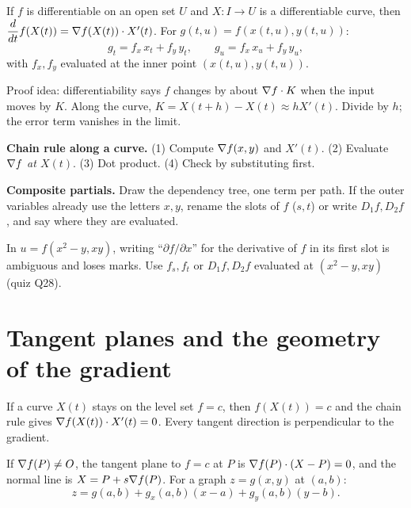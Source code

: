 \begin{thm}
If $f$ is differentiable on an open set $U$ and $X:I\to U$ is a differentiable curve, then
$\dfrac{d}{dt}f(X(t))=\nabla f(X(t))\cdot X'(t)$. For $g(t,u)=f(x(t,u),y(t,u))$:
\[ g_t=f_x\,x_t+f_y\,y_t,\qquad g_u=f_x\,x_u+f_y\,y_u, \]
with $f_x,f_y$ evaluated at the inner point $(x(t,u),y(t,u))$.
\end{thm}

\begin{intuition}
Proof idea: differentiability says $f$ changes by about $\nabla f\cdot K$ when the input
moves by $K$. Along the curve, $K=X(t+h)-X(t)\approx hX'(t)$. Divide by $h$; the error
term vanishes in the limit.
\end{intuition}

\begin{method}
\textbf{Chain rule along a curve.} (1) Compute $\nabla f(x,y)$ and $X'(t)$.
(2) Evaluate $\nabla f$ \emph{at $X(t)$}. (3) Dot product. (4) Check by substituting first.

\textbf{Composite partials.} Draw the dependency tree, one term per path. If the outer
variables already use the letters $x,y$, rename the slots of $f$ ($s,t$) or write
$D_1f,D_2f$, and say where they are evaluated.
\end{method}

\begin{trap}
In $u=f(x^2-y,xy)$, writing ``$\partial f/\partial x$'' for the derivative of $f$ in its
first slot is ambiguous and loses marks. Use $f_s,f_t$ or $D_1f,D_2f$ evaluated at
$(x^2-y,xy)$ (quiz Q28).
\end{trap}

\section{Tangent planes and the geometry of the gradient}

If a curve $X(t)$ stays on the level set $f=c$, then $f(X(t))=c$ and the chain rule gives
$\nabla f(X(t))\cdot X'(t)=0$. Every tangent direction is perpendicular to the gradient.

\begin{thm}
If $\nabla f(P)\ne O$, the tangent plane to $f=c$ at $P$ is $\nabla f(P)\cdot(X-P)=0$, and
the normal line is $X=P+s\nabla f(P)$. For a graph $z=g(x,y)$ at $(a,b)$:
\[ z=g(a,b)+g_x(a,b)(x-a)+g_y(a,b)(y-b). \]
\end{thm}

